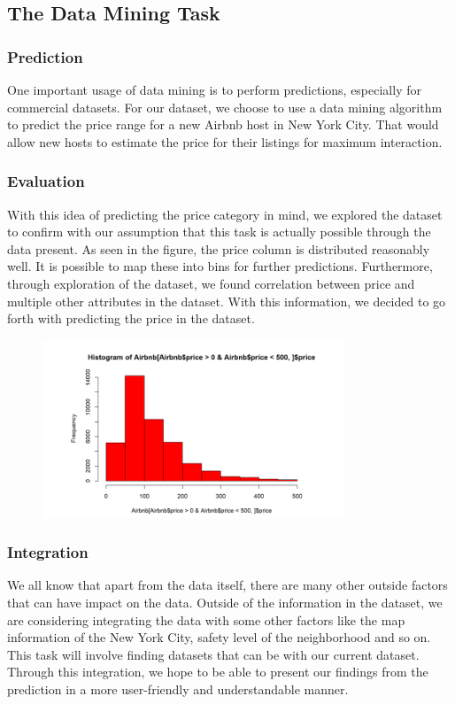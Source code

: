 \documentclass{sig-alternate}
\begin{document}
	\subsection{The Data Mining Task}
	\subsubsection{Prediction}
	One important usage of data mining is to perform predictions, especially for commercial
	datasets. For our dataset, we choose to use a data mining algorithm to predict the price range for a new Airbnb host in New York City. That would allow new hosts to estimate the price for their listings for maximum interaction. 
	\subsubsection{Evaluation}
	With this idea of predicting the price category in mind, we explored the dataset to confirm with our assumption that this task is actually possible through the data present. As seen in the figure, the price column is distributed reasonably well. It is possible to map these into bins for further predictions. Furthermore, through exploration of the dataset, we found correlation between price and multiple other attributes in the dataset. With this information, we decided to go forth with predicting the price in the dataset. 
	\begin{figure}[ht]
		\includegraphics[width=9cm]{hist.png}
		\label{hist}
		\centering
	\end{figure} 
	\subsubsection{Integration}
	We all know that apart from the data itself, there are many other outside factors that can 
	have impact on the data. Outside of the information in the dataset, we are considering integrating the data with some other factors like the map information of the New York City, safety level of the neighborhood and so on.
	This task will involve finding datasets that can be with our current dataset. Through this integration, we hope to be able to present our findings from the prediction in a more user-friendly and understandable manner. 
	
\end{document}
